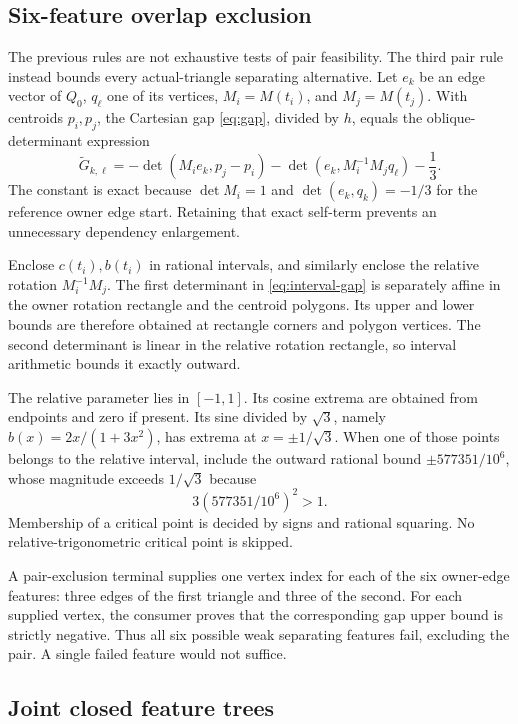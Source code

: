 \documentclass[11pt]{article}
\begin{document}
\subsection{Six-feature overlap exclusion}

The previous rules are not exhaustive tests of pair feasibility. The third pair rule instead bounds every actual-triangle separating alternative. Let $e_k$ be an edge vector of $Q_0$, $q_\ell$ one of its vertices, $M_i=M(t_i)$, and $M_j=M(t_j)$. With centroids $p_i,p_j$, the Cartesian gap \eqref{eq:gap}, divided by $h$, equals the oblique-determinant expression
\begin{equation}\label{eq:interval-gap}
 \widetilde G_{k,\ell}
 =-\det(M_i e_k,p_j-p_i)
  -\det(e_k,M_i^{-1}M_jq_\ell)-\frac13.
\end{equation}
The constant is exact because $\det M_i=1$ and $\det(e_k,q_k)=-1/3$ for the reference owner edge start. Retaining that exact self-term prevents an unnecessary dependency enlargement.

Enclose $c(t_i),b(t_i)$ in rational intervals, and similarly enclose the relative rotation $M_i^{-1}M_j$. The first determinant in \eqref{eq:interval-gap} is separately affine in the owner rotation rectangle and the centroid polygons. Its upper and lower bounds are therefore obtained at rectangle corners and polygon vertices. The second determinant is linear in the relative rotation rectangle, so interval arithmetic bounds it exactly outward.

The relative parameter lies in $[-1,1]$. Its cosine extrema are obtained from endpoints and zero if present. Its sine divided by $\sqrt3$, namely $b(x)=2x/(1+3x^2)$, has extrema at $x=\pm1/\sqrt3$. When one of those points belongs to the relative interval, include the outward rational bound $\pm577351/10^6$, whose magnitude exceeds $1/\sqrt3$ because
\[
 3(577351/10^6)^2>1.
\]
Membership of a critical point is decided by signs and rational squaring. No relative-trigonometric critical point is skipped.

A pair-exclusion terminal supplies one vertex index for each of the six owner-edge features: three edges of the first triangle and three of the second. For each supplied vertex, the consumer proves that the corresponding gap upper bound is strictly negative. Thus all six possible weak separating features fail, excluding the pair. A single failed feature would not suffice.

\subsection{Joint closed feature trees}
\end{document}
